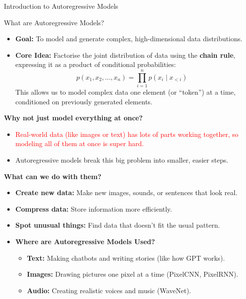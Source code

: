 \begin{frame}[allowframebreaks]{}
    \centering
    \LARGE Introduction to Autoregressive Models
\end{frame}

\begin{frame}[allowframebreaks]{What are Autoregressive Models?}
    \begin{itemize}
        \item \textbf{Goal:} To model and generate complex, high-dimensional data distributions.
        \item \textbf{Core Idea:} Factorise the joint distribution of data using the \textbf{chain rule}, expressing it as a product of conditional probabilities:
        \[
        p(x_1, x_2, \ldots, x_n) = \prod_{i=1}^n p(x_i \mid x_{<i})
        \]
        This allows us to model complex data one element (or ``token'') at a time, conditioned on previously generated elements.
    \end{itemize}

    \framebreak
    
    \textbf{Why not just model everything at once?}
        \begin{itemize}
            \item \textcolor{red}{Real-world data (like images or text) has lots of parts working together, so modeling all of them at once is super hard.}
            \item \textcolor[rgb]{0,0.5,0}{Autoregressive models break this big problem into smaller, easier steps.}
        \end{itemize}
    \vspace{2em}
    \textbf{What can we do with them?}
        \begin{itemize}
            \item \textbf{Create new data:} Make new images, sounds, or sentences that look real.
            \item \textbf{Compress data:} Store information more efficiently.
            \item \textbf{Spot unusual things:} Find data that doesn’t fit the usual pattern.
        \end{itemize}

    \framebreak

    \begin{itemize}
        \item \textbf{Where are Autoregressive Models Used?}
            \begin{itemize}
                \item \textbf{Text:} Making chatbots and writing stories (like how GPT works).
                \item \textbf{Images:} Drawing pictures one pixel at a time (PixelCNN, PixelRNN).
                \item \textbf{Audio:} Creating realistic voices and music (WaveNet).
            \end{itemize}
    \end{itemize}
\end{frame}